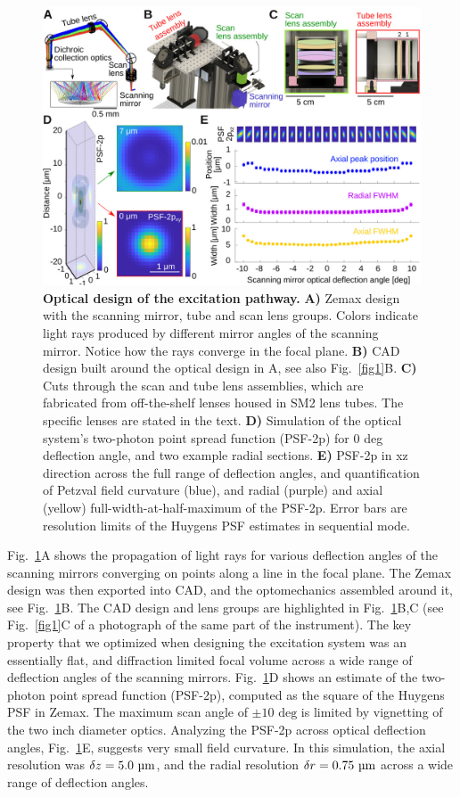 \documentclass[10pt,letterpaper]{article}
\begin{document}
\begin{figure}[!t]
    \includegraphics[width=\textwidth]{fig2.jpg}
    \caption{{\bf Optical design of the excitation pathway.} \textbf{A)} Zemax design with the scanning mirror, tube and scan lens groups. Colors indicate light rays produced by different mirror angles of the scanning mirror. Notice how the rays converge in the focal plane. \textbf{B)} CAD design built around the optical design in A, see also Fig.~\ref{fig1}B. \textbf{C)} Cuts through the scan and tube lens assemblies, which are fabricated from off-the-shelf lenses housed in SM2 lens tubes. The specific lenses are stated in the text. \textbf{D)} Simulation of the optical system's two-photon point spread function (PSF-2p) for 0 deg deflection angle, and two example radial sections. \textbf{E)} PSF-2p in xz direction across the full range of deflection angles, and quantification of Petzval field curvature (blue), and radial (purple) and axial (yellow) full-width-at-half-maximum of the PSF-2p. Error bars are resolution limits of the Huygens PSF estimates in sequential mode.}
    \label{fig2}
\end{figure}
%
Fig.~\ref{fig2}A shows the propagation of light rays for various deflection angles of the scanning mirrors converging on points along a line in the focal plane. The Zemax design was then exported into CAD, and the optomechanics assembled around it, see Fig.~\ref{fig2}B. The CAD design and lens groups are highlighted in Fig.~\ref{fig2}B,C (see Fig.~\ref{fig1}C of a photograph of the same part of the instrument). The key property that we optimized when designing the excitation system was an essentially flat, and diffraction limited focal volume across a wide range of deflection angles of the scanning mirrors. Fig.~\ref{fig2}D shows an estimate of the two-photon point spread function (PSF-2p), computed as the square of the Huygens PSF in Zemax. The maximum scan angle of $\pm 10\text{ deg}$ is limited by vignetting of the two inch diameter optics. Analyzing the PSF-2p across optical deflection angles, Fig.~\ref{fig2}E, suggests very small field curvature. In this simulation, the axial resolution was $\delta z = 5.0\text{ \textmu m}$, and the radial resolution $\delta r = 0.75\text{ \textmu m}$ across a wide range of deflection angles.\newline
\end{document}
